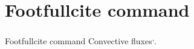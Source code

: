 \section{Footfullcite command}
\begin{frame}{Footfullcite command}
Convective fluxes\textsuperscript{,}.
\end{frame}
